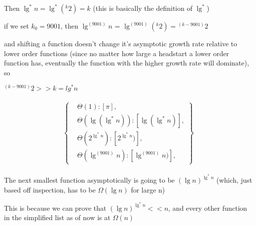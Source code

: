 \documentclass[11pt,fleqn]{article}
\theoremstyle{definition}
\theoremstyle{remark}
\begin{document}
Then $\lg^*n = \lg^*{({}^k 2)} = k$ (this is basically the definition of $\lg^*$)

if we set $k_0 = 9001$, then $\lg^{(9001)} n$ = $\lg^{(9001)} ({}^k 2) = {}^{(k-9001)} 2$

and shifting a function doesn't change it's asymptotic growth rate relative
to lower order functions (since no matter how large a headstart a lower order
function has, eventually the function with the higher growth rate will dominate), so

${}^{(k - 9001)} 2 >> k =lg^*n$\\\\

\[
\left\{
\begin{aligned}
& \Theta(1): [\pi],\\
& \Theta(\lg(\lg^*n)): [\lg(\lg^*n)],\\
& \Theta(2^{\lg^*n}): [2^{\lg^*n})],\\
& \Theta(\lg^{(9001)} n): [\lg^{(9001)} n)],
\end{aligned}
\right\}
\]\\


The next smallest function asymptotically is going to be
${(\lg n)}^{\lg^*{n}}$ (which, just based off inspection, has to be $\Omega(\lg n)$ for large n)

This is because we can prove that ${(\lg n)}^{\lg^*{n}} << n$, and
every other function in the simplified list as of now is at $\Omega(n)$
\end{document}
